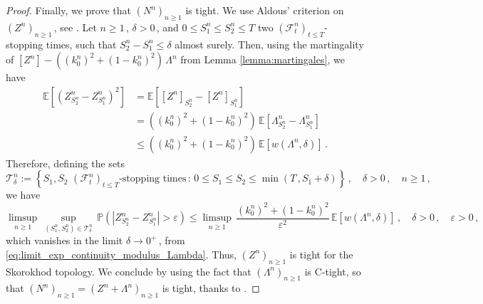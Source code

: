 \documentclass{article}
\newcommand{\1}{\mathbbm{1}}
\numberwithin{equation}{section}
\begin{document}
\begin{proof}
Finally, we prove that $\left(N^n\right)_{n \geq 1}$ is tight. We use Aldous' criterion on $\left(Z^n\right)_{n \geq 1}\,$, see \citet[Theorem~VI.4.5]{jacod2013limit}. Let $n \geq 1\,$, $\delta > 0\,$, and $0 \leq S_1^n \leq S_2^n \leq T$ two $\left(\mathcal F^n_t\right)_{t \leq T}$-stopping times, such that $S_2^n - S_1^n \leq \delta$ almost surely. Then, using the martingality of $[Z^n] - \left(\left(k_0^n\right)^2 + \left(1 - k_0^n\right)^2\right)\,\Lambda^n$ from Lemma \ref{lemma:martingales}, we have 
\begin{align*}
\mathbb E \left[\left(Z^n_{S_2^n} - Z^n_{S_1^n} \right)^2\right] &= \mathbb E \left[[Z^n]_{S_2^n} - [Z^n]_{S_1^n} \right]\\
&= \left(\left(k_0^n\right)^2 + \left(1 - k_0^n\right)^2\right)\,\mathbb E \left[\Lambda^n_{S_2^n} - \Lambda^n_{S_1^n}\right] \\
&\leq \left( \left(k_0^n\right)^2 + \left(1 - k_0^n\right)^2\right)\, \mathbb E \left[w\left(\Lambda^n,\delta\right)\right]\,.
\end{align*}
Therefore, defining the sets
$$
\mathcal T^n_{\delta} := \left\{S_1, S_2 \,\,\text{$\left(\mathcal F^n_t\right)_{t \leq T}$-stopping times}\,:\, 0 \leq S_1 \leq S_2 \leq \min(T\,, S_1 + \delta) \right\}\,, \quad \delta > 0\,, \quad n \geq 1\,,
$$
we have 
$$
\limsup_{n \geq 1}\,\sup_{\left(S_1^n,S_2^n\right) \in \mathcal T^n_{\delta}}\, \mathbb P \left(\left|Z^n_{S_2^n} - Z^n_{S_1^n}\right| > \varepsilon \right) \leq \limsup_{n \geq 1}\,\frac{\left(k_0^n\right)^2+ \left(1 - k_0^n\right)^2}{\varepsilon^2}\, \mathbb E \left[w\left(\Lambda^n, \delta\right)\right]\,, \quad \delta > 0\,, \quad \varepsilon > 0\,,
$$
which vanishes in the limit $\delta \to 0^+\,$, from \eqref{eq:limit_exp_continuity_modulus_Lambda}. Thus, $\left(Z^n\right)_{n \geq 1}$ is tight for the Skorokhod topology. We conclude by using the fact that $\left(\Lambda^n\right)_{n \geq 1}$ is C-tight, so that $\left(N^n\right)_{n \geq 1} = \left(Z^n + \Lambda^n\right)_{n \geq 1}$ is tight, thanks to \citet[Corollary~VI.3.33]{jacod2013limit}.
\end{proof}
\end{document}
